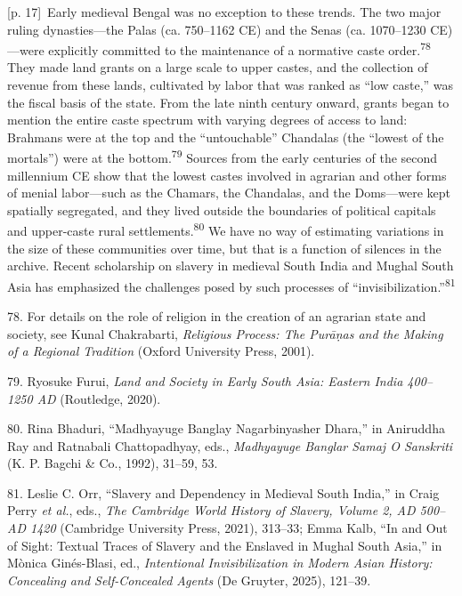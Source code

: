 \documentclass[10pt,a4paper]{article}
\begin{document}
{\scriptsize\color{gray} [p. 17]}\ Early medieval Bengal was no exception to these trends. The two major ruling dynasties—the Palas (ca. 750–1162 CE) and the Senas (ca. 1070–1230 CE)—were explicitly committed to the maintenance of a normative caste order.\nobreak\textsuperscript{78} They made land grants on a large scale to upper castes, and the collection of revenue from these lands, cultivated by labor that was ranked as “low caste,” was the fiscal basis of the state. From the late ninth century onward, grants began to mention the entire caste spectrum with varying degrees of access to land: Brahmans were at the top and the “untouchable” Chandalas (the “lowest of the mortals”) were at the bottom.\nobreak\textsuperscript{79} Sources from the early centuries of the second millennium CE show that the lowest castes involved in agrarian and other forms of menial labor—such as the Chamars, the Chandalas, and the Doms—were kept spatially segregated, and they lived outside the boundaries of political capitals and upper-caste rural settlements.\nobreak\textsuperscript{80} We have no way of estimating variations in the size of these communities over time, but that is a function of silences in the archive. Recent scholarship on slavery in medieval South India and Mughal South Asia has emphasized the challenges posed by such processes of “invisibilization.”\nobreak\textsuperscript{81}\par{\small 78. For details on the role of religion in the creation of an agrarian state and society, see Kunal Chakrabarti, \textit{Religious Process: The Purāṇas and the Making of a Regional Tradition} (Oxford University Press, 2001).\par}{\small 79. Ryosuke Furui, \textit{Land and Society in Early South Asia: Eastern India 400–1250 AD} (Routledge, 2020).\par}{\small 80. Rina Bhaduri, “Madhyayuge Banglay Nagarbinyasher Dhara,” in Aniruddha Ray and Ratnabali Chattopadhyay, eds., \textit{Madhyayuge Banglar Samaj O Sanskriti} (K. P. Bagchi \& Co., 1992), 31–59, 53.\par}{\small 81. Leslie C. Orr, “Slavery and Dependency in Medieval South India,” in Craig Perry \textit{et al.}, eds., \textit{The Cambridge World History of Slavery, Volume 2, AD 500–AD 1420} (Cambridge University Press, 2021), 313–33; Emma Kalb, “In and Out of Sight: Textual Traces of Slavery and the Enslaved in Mughal South Asia,” in Mònica Ginés-Blasi, ed., \textit{Intentional Invisibilization in Modern Asian History: Concealing and Self-Concealed Agents} (De Gruyter, 2025), 121–39.\par}
\end{document}
